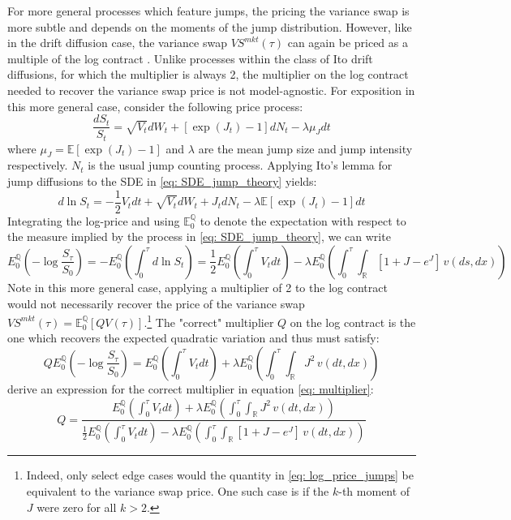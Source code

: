 \documentclass[12pt]{article}
\begin{document}
For more general processes which feature jumps, the pricing the variance swap is more subtle and depends on the moments of the jump distribution. However, like in the drift diffusion case, the variance swap $VS^{mkt}(\tau)$ can again be priced as a multiple of the log contract \citep{carr2021pricing}. Unlike processes within the class of Ito drift diffusions, for which the multiplier is always 2, the multiplier on the log contract needed to recover the variance swap price is not model-agnostic. For exposition in this more general case, consider the following price process:
\begin{equation}\label{eq: SDE_jump_theory}
   \dfrac{dS_t}{S_t}=\sqrt{V_t} d W_t+[\exp(J_t) - 1] d N_t- \lambda \mu_J d t
\end{equation}
where $\mu_J = \mathbb{E}\left[\exp(J_t) - 1\right]$ and $\lambda$ are the mean jump size and jump intensity respectively. $N_t$ is the usual jump counting process. Applying Ito's lemma for jump diffusions to the SDE in \eqref{eq: SDE_jump_theory} yields: 
\begin{equation}
    d \ln S_t=-\frac{1}{2} V_t d t+\sqrt{V_t} d W_t+ J_t d N_t-\lambda \mathbb{E}[\exp(J_t) - 1] d t
\end{equation}
Integrating the log-price and using $\mathbb{E}_0^\mathbb{Q}$ to denote the expectation with respect to the measure implied by the process in \eqref{eq: SDE_jump_theory}, we can write
\begin{equation}\label{eq: log_price_jumps}
  E_0^\mathbb{Q}\left(-\log\dfrac{S_\tau}{S_0}\right) =  -E_0^\mathbb{Q}\left(\int_0^\tau d \ln S_t\right)= \frac{1}{2} E_0^\mathbb{Q}\left(\int_0^\tau V_t d t \right)-\lambda E_0^\mathbb{Q}\left(\int_0^\tau \int_\mathbb{R} [1 + J - e^{J}]  \, v(ds, dx)  \right) 
\end{equation}
Note in this more general case, applying a multiplier of 2 to the log contract would not necessarily recover the price of the variance swap $VS^{mkt}(\tau) = \mathbb{E}^\mathbb{Q}_0[QV(\tau)]$.\footnote{Indeed, only select edge cases would the quantity in \eqref{eq: log_price_jumps} be equivalent to the variance swap price. One such case is if the $k$-th moment of $J$ were zero for all $k > 2$. } The "correct" multiplier $Q$ on the log contract is the one which recovers the expected quadratic variation and thus must satisfy:
\begin{equation}\label{eq: multiplier}
  QE_0^\mathbb{Q}\left(-\log\dfrac{S_\tau}{S_0}\right) =  E_0^\mathbb{Q}\left(\int_0^\tau V_t d t \right) + \lambda E_0^\mathbb{Q}\left(\int_0^\tau \int_\mathbb{R} J^2  \, v(dt, dx)  \right) 
\end{equation}
\cite{carr2012variance} derive an expression for the correct multiplier in equation \eqref{eq: multiplier}:
\begin{equation}\label{eq: log_price_jumps}
      Q = \dfrac{E_0^\mathbb{Q}\left(\int_0^\tau V_t d t \right) + \lambda E_0^\mathbb{Q}\left(\int_0^\tau \int_\mathbb{R} J^2  \,  v(dt, dx)  \right) }{\frac{1}{2}E_0^\mathbb{Q}\left(\int_0^\tau V_t d t \right) - \lambda E_0^\mathbb{Q}\left(\int_0^\tau \int_\mathbb{R} [1 + J - e^{J}]  \,  v(dt, dx)  \right) }
\end{equation}
\end{document}
